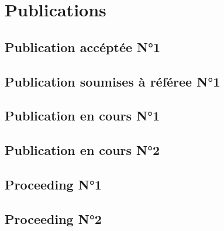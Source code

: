 \part{Publications}

\cleardoublepage \chapter{Publication accéptée N°1} \label{pap:EMMA}
\cleardoublepage  

\cleardoublepage \chapter{Publication soumises à référee N°1} \label{pap:feedback}
\cleardoublepage  

\cleardoublepage \chapter{Publication en cours N°1}\label{pap:c}
\cleardoublepage  

\cleardoublepage \chapter{Publication en cours N°2} \label{pap:z0}
\cleardoublepage  

\cleardoublepage \chapter{Proceeding N°1 } \label{pap:feedback_proceeding}
\cleardoublepage 

\cleardoublepage \chapter{Proceeding N°2} \label{pap:visu}
\cleardoublepage  
